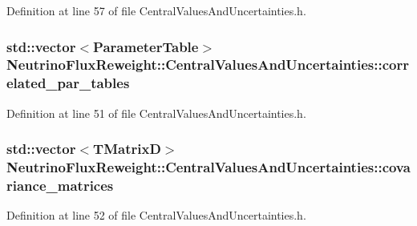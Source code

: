 Definition at line 57 of file Central\-Values\-And\-Uncertainties.\-h.

\hypertarget{class_neutrino_flux_reweight_1_1_central_values_and_uncertainties_a6bfc15e23731abe341522e207637690a}{
\subsubsection[{correlated\-\_\-par\-\_\-tables}]{\setlength{\rightskip}{0pt plus 5cm}std\-::vector$<${\bf Parameter\-Table}$>$ Neutrino\-Flux\-Reweight\-::\-Central\-Values\-And\-Uncertainties\-::correlated\-\_\-par\-\_\-tables\hspace{0.3cm}{\ttfamily [private]}}}\label{class_neutrino_flux_reweight_1_1_central_values_and_uncertainties_a6bfc15e23731abe341522e207637690a}


Definition at line 51 of file Central\-Values\-And\-Uncertainties.\-h.

\hypertarget{class_neutrino_flux_reweight_1_1_central_values_and_uncertainties_a7dbe89396ded22dc694de13bc1fad309}{
\subsubsection[{covariance\-\_\-matrices}]{\setlength{\rightskip}{0pt plus 5cm}std\-::vector$<$T\-Matrix\-D$>$ Neutrino\-Flux\-Reweight\-::\-Central\-Values\-And\-Uncertainties\-::covariance\-\_\-matrices\hspace{0.3cm}{\ttfamily [private]}}}\label{class_neutrino_flux_reweight_1_1_central_values_and_uncertainties_a7dbe89396ded22dc694de13bc1fad309}


Definition at line 52 of file Central\-Values\-And\-Uncertainties.\-h.

